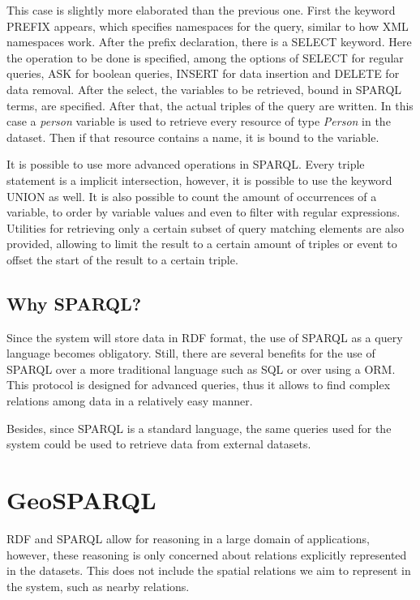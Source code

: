 This case is slightly more elaborated than the previous one. First the keyword PREFIX appears, which specifies namespaces for the query, similar to how XML namespaces work. After the prefix declaration, there is a SELECT keyword. Here the operation to be done is specified, among the options of SELECT for regular queries, ASK for boolean queries, INSERT for data insertion and DELETE for data removal. After the select, the variables to be retrieved, bound in SPARQL terms, are specified. After that, the actual triples of the query are written. In this case a \textit{person} variable is used to retrieve every resource of type \textit{Person} in the dataset. Then if that resource contains a name, it is bound to the variable.

It is possible to use more advanced operations in SPARQL. Every triple statement is a implicit intersection, however, it is possible to use the keyword UNION as well. It is also possible to count the amount of occurrences of a variable, to order by variable values and even to filter with regular expressions. Utilities for retrieving only a certain subset of query matching elements are also provided, allowing to limit the result to a certain amount of triples or event to offset the start of the result to a certain triple.

\subsection*{Why SPARQL?}

Since the system will store data in RDF format, the use of SPARQL as a query language becomes obligatory. Still, there are several benefits for the use of SPARQL over a more traditional language such as SQL or over using a ORM. This protocol is designed for advanced queries, thus it allows to find complex relations among data in a relatively easy manner. 

Besides, since SPARQL is a standard language, the same queries used for the system could be used to retrieve data from external datasets.

\section{GeoSPARQL}\label{sec:geosparql}

RDF and SPARQL allow for reasoning in a large domain of applications, however, these reasoning is only concerned about relations explicitly represented in the datasets. This does not include the spatial relations we aim to represent in the system, such as nearby relations.

